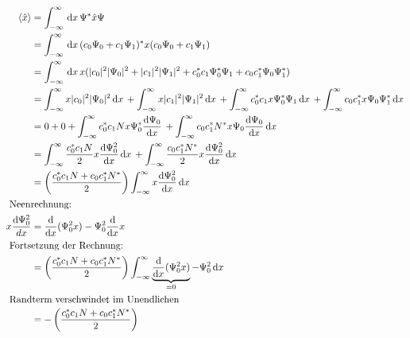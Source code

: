 \begin{align}
    \langle \hat x \rangle &= \int_{-\infty}^{\infty} \,\mathrm{d}x\, \Psi^* \hat x \Psi \\
    &=\int_{-\infty}^{\infty} \,\mathrm{d}x\, (c_0 \Psi _0 + c_1 \Psi _1)^*x(c_0 \Psi _0+c_1 \Psi _1)\\
    &=\int_{-\infty}^{\infty} \,\mathrm{d}x\, x (\lvert c_0\rvert^2\lvert\Psi _0\rvert^2+\lvert c_1\rvert^2 \lvert\Psi _1\rvert^2 + c_0^* c_1 \Psi_0^*\Psi _1+c_0 c_1^* \Psi _0 \Psi _1^*)\\
    &=\int_{-\infty}^{\infty} x \lvert c_0\rvert^2 \lvert\Psi _0\rvert^2 \,\mathrm{d}x\, +\int_{-\infty}^{\infty}  
    x \lvert c_1\rvert^2 \lvert\Psi _1\rvert^2 \,\mathrm{d}x\, +\int_{-\infty}^{\infty} c_0^* c_1 x \Psi_0^*\Psi_1 \,\mathrm{d}x\,
    + \int_{-\infty}^{\infty}  c_0 c_1^*x \Psi _0 \Psi_1^* \,\mathrm{d}x\,\\
    &= 0+0+\int_{-\infty}^{\infty} c_0^*c_1 N x \Psi _0^* \frac{\mathrm{d}\Psi _0}{\mathrm{d}x} \,+\int_{-\infty}^{\infty}  c_0 c_1^* N^* x \Psi _0 \frac{\mathrm{d}\Psi _0}{\mathrm{d}x} \,\mathrm{d}x\, \\
    &= \int_{-\infty}^{\infty} \frac{c_0^*c_1N}{2}x \frac{\mathrm{d} \Psi _0^2}{\mathrm{d}x}  \,\mathrm{d}x\, +\int_{-\infty}^{\infty} \frac{c_0 c_1^* N^*}{2}x \frac{\mathrm{d}\Psi _0^2 }{\mathrm{d}x} \,\mathrm{d}x\,\\
    &=\left(\frac{c_0^* c_1 N+c_0c_1^*N^*}{2}\right)\int_{-\infty}^{\infty} x \frac{\mathrm{d}\Psi _0^2 }{\mathrm{d}x} \,\mathrm{d}x\, \\
    \intertext {
        Neenrechnung:
    }    
    x\frac{\mathrm{d}\Psi _0^2}{dx} &= \frac{\mathrm{d}}{\mathrm{d}x}(\Psi _0^2 x)-\Psi_0^2 \frac{\mathrm{d}}{\mathrm{d}x}x\\
    \intertext{
        Fortsetzung der Rechnung:
    }
    &= \left(\frac{c_0^* c_1 N+c_0c_1^*N^*}{2}\right) \int_{-\infty}^{\infty} \underbrace{\frac{\mathrm{d}}{\mathrm{d}x}(\Psi _0^2 x)}_{=0} -\Psi_0^2 \,\mathrm{d}x\, \\
    \intertext{
        Randterm verschwindet im Unendlichen
    }
    &= -\left(\frac{c_0^* c_1 N+c_0c_1^*N^*}{2}\right)
\end{align}

